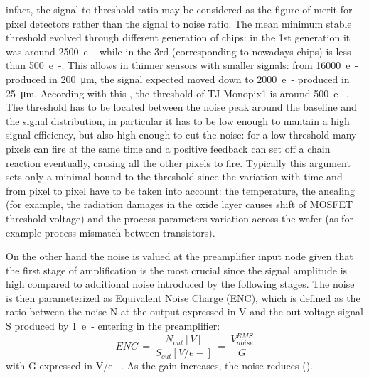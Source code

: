         infact, the signal to threshold ratio may be considered as the figure of merit for pixel detectors rather than the signal to noise ratio.
        The mean minimum stable threshold evolved through different generation of chips: in the 1st generation it was around \SI{2500}{e-} while in the 3rd (corresponding to nowadays chips) is less than \SI{500}{e-}. This allows in thinner sensors with smaller signals: from \SI{16000}{e-} produced in \SI{200}{\um}, the signal expected moved down to \SI{2000}{e-} produced in \SI{25}{\um}. According with this , the threshold of TJ-Monopix1 is around \SI{500}{e-}.
        The threshold has to be located between the noise peak around the baseline and the signal distribution, in particular it has to be low enough to mantain a high signal efficiency, but also high enough to cut the noise: for a low threshold many pixels can fire at the same time and a positive feedback can set off a chain reaction eventually, causing all the other pixels to fire.
        Typically this argument sets only a minimal bound to the threshold since the variation with time and from pixel to pixel have to be taken into account: the temperature, the anealing (for example, the radiation damages in the oxide layer causes shift of MOSFET threshold voltage) and the process parameters variation across the wafer (as for example process mismatch between transistors). 
        
        On the other hand the noise is valued at the preamplifier input node given that the first stage of amplification is the most crucial since the signal amplitude is high compared to additional noise introduced by the following stages.
        The noise is then parameterized as Equivalent Noise Charge (ENC), which is defined as the ratio between the noise N at the output expressed in V and the out voltage signal S produced by \SI{1}{e-} entering in the preamplifier:
        \begin{equation}
            ENC\, =\, \frac{N_{out}[V]}{S_{out}[V/e-]}\,=\,\frac{V^{RMS} _{noise}}{G}
        \end{equation} 
        with G expressed in \si{V/e-}.
        As the gain increases, the noise reduces (). 

